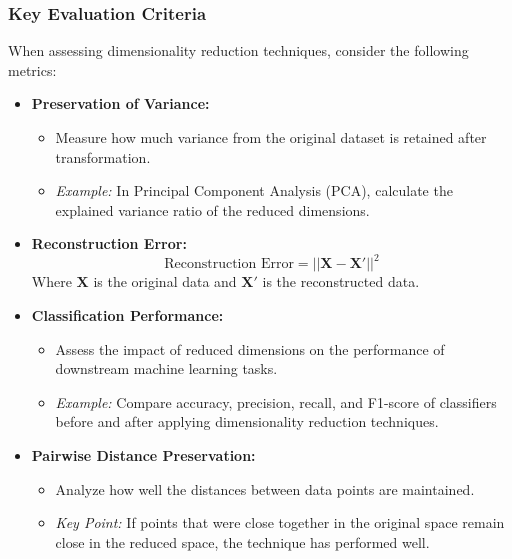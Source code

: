 \documentclass[aspectratio=169]{beamer}
\begin{document}
\begin{frame}[fragile]
    \frametitle{Key Evaluation Criteria}
    When assessing dimensionality reduction techniques, consider the following metrics:
    \begin{itemize}
        \item \textbf{Preservation of Variance:}
            \begin{itemize}
                \item Measure how much variance from the original dataset is retained after transformation.
                \item \textit{Example:} In Principal Component Analysis (PCA), calculate the explained variance ratio of the reduced dimensions.
            \end{itemize}
        \item \textbf{Reconstruction Error:}
            \begin{equation}
                \text{Reconstruction Error} = || \mathbf{X} - \mathbf{X'} ||^2
            \end{equation}
            Where \( \mathbf{X} \) is the original data and \( \mathbf{X'} \) is the reconstructed data.
        \item \textbf{Classification Performance:}
            \begin{itemize}
                \item Assess the impact of reduced dimensions on the performance of downstream machine learning tasks.
                \item \textit{Example:} Compare accuracy, precision, recall, and F1-score of classifiers before and after applying dimensionality reduction techniques.
            \end{itemize}
        \item \textbf{Pairwise Distance Preservation:}
            \begin{itemize}
                \item Analyze how well the distances between data points are maintained.
                \item \textit{Key Point:} If points that were close together in the original space remain close in the reduced space, the technique has performed well.
            \end{itemize}
    \end{itemize}
\end{frame}
\end{document}
